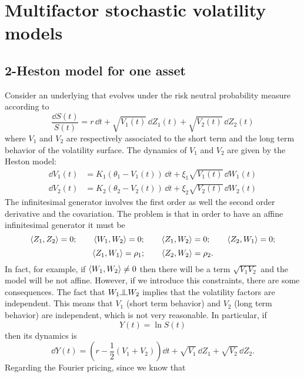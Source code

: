 \section{Multifactor stochastic volatility models}
\subsection{2-Heston model for one asset}
Consider an underlying that evolves under the risk neutral probability measure according to
\begin{equation}
    \frac{\dd S(t)}{S(t)} = r\,\dd t + \sqrt{V_1(t)}\,\dd Z_1(t) + \sqrt{V_2(t)}\,\dd Z_2(t)
\end{equation}
where $V_1$ and $V_2$ are respectively associated to the short term and the long term behavior of the volatility surface. The dynamics of $V_1$ and $V_2$ are given by the Heston model:
\begin{align}
    \dd V_1(t) &= K_1(\theta_1 - V_1(t))\,\dd t + \xi_1\sqrt{V_1(t)}\,\dd W_1(t) \\
    \dd V_2(t) &= K_2(\theta_2 - V_2(t))\,\dd t + \xi_2\sqrt{V_2(t)}\,\dd W_2(t)
\end{align}
The infinitesimal generator involves the first order as well the second order derivative and the covariation. The problem is that in order to have an affine infinitesimal generator it must be
\begin{equation*}
    \expval{Z_1,Z_2} = 0; \qquad \expval{W_1,W_2} = 0; \qquad \expval{Z_1,W_2} = 0; \qquad \expval{Z_2,W_1} = 0;
\end{equation*}
\begin{equation*}
    \expval{Z_1,W_1} = \rho_1; \qquad \expval{Z_2,W_2} = \rho_2.
\end{equation*}
In fact, for example, if $\expval{W_1,W_2}\ne 0$ then there will be a term $\sqrt{V_1V_2}$ and the model will be not affine. However, if we introduce this constraints, there are some consequences. The fact that $W_1 \indep W_2$ implies that the volatility factors are independent. This means that $V_1$ (short term behavior) and $V_2$ (long term behavior) are independent, which is not very reasonable. In particular, if
\begin{equation}
    Y(t) = \ln S(t)
\end{equation}
then its dynamics is
\begin{equation}
    \dd Y(t) = \left(r-\frac{1}{2}(V_1+V_2)\right)\dd t + \sqrt{V_1}\,\dd Z_1 + \sqrt{V_2}\,\dd Z_2.
\end{equation}
Regarding the Fourier pricing, since we know that
